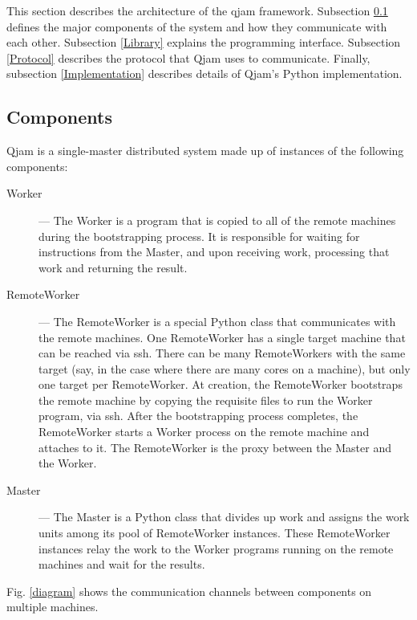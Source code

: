 \documentclass[%
  final,
  notitlepage,
  narroweqnarray,
  inline,
]{ieee}
\begin{document}
This section describes the architecture of the qjam framework. Subsection
\ref{Components} defines the major components of the system and how they
communicate with each other. Subsection \ref{Library} explains the programming
interface. Subsection \ref{Protocol} describes the protocol that Qjam uses to
communicate. Finally, subsection \ref{Implementation} describes details of
Qjam's Python implementation.

\subsection{Components}
\label{Components}

Qjam is a single-master distributed system made up of instances of the
following components: \\

\begin{description}
  \item[Worker] --- The Worker is a program that is copied to all of the remote
    machines during the bootstrapping process. It is responsible for waiting
    for instructions from the Master, and upon receiving work, processing that
    work and returning the result. \\

  \item[RemoteWorker] --- The RemoteWorker is a special Python class that
    communicates with the remote machines. One RemoteWorker has a single target
    machine that can be reached via ssh. There can be many RemoteWorkers with
    the same target (say, in the case where there are many cores on a machine),
    but only one target per RemoteWorker. At creation, the RemoteWorker
    bootstraps the remote machine by copying the requisite files to run the
    Worker program, via ssh. After the bootstrapping process completes, the
    RemoteWorker starts a Worker process on the remote machine and attaches to
    it. The RemoteWorker is the proxy between the Master and the Worker. \\

  \item[Master] --- The Master is a Python class that divides up work and
    assigns the work units among its pool of RemoteWorker instances. These
    RemoteWorker instances relay the work to the Worker programs running on the
    remote machines and wait for the results. \\
\end{description}

Fig. \ref{diagram} shows the communication channels between components on
multiple machines.
\end{document}
